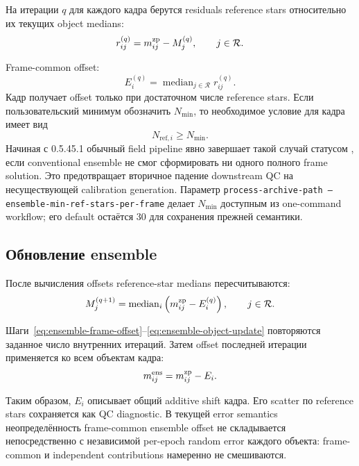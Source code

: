 На итерации $q$ для каждого кадра берутся residuals reference stars относительно их текущих object medians:
\begin{equation}
  r_{ij}^{(q)}=m^{\rm zp}_{ij}-M_j^{(q)},
  \qquad j\in\mathcal R.
\end{equation}

Frame-common offset:
\begin{equation}
  E_i^{(q)}=
  \operatorname{median}_{j\in\mathcal R}r_{ij}^{(q)}.
  \label{eq:ensemble-frame-offset}
\end{equation}
Кадр получает offset только при достаточном числе reference stars. Если пользовательский минимум
обозначить $N_{\min}$, то необходимое условие для кадра имеет вид
\begin{equation}
  N_{\mathrm{ref},i} \ge N_{\min}.
  \label{eq:ensemble-min-ref}
\end{equation}
Начиная с 0.5.45.1 обычный field pipeline явно завершает такой случай статусом
, если conventional ensemble не смог сформировать ни одного
полного frame solution. Это предотвращает вторичное падение downstream QC на несуществующей
calibration generation. Параметр \texttt{process-archive-path --ensemble-min-ref-stars-per-frame}
делает $N_{\min}$ доступным из one-command workflow; его default остаётся 30 для сохранения прежней
семантики.

\subsection{Обновление ensemble}

После вычисления offsets reference-star medians пересчитываются:
\begin{equation}
  M_j^{(q+1)}=
  \operatorname{median}_{i}
  \left(m^{\rm zp}_{ij}-E_i^{(q)}\right),
  \qquad j\in\mathcal R.
  \label{eq:ensemble-object-update}
\end{equation}

Шаги~\eqref{eq:ensemble-frame-offset}--\eqref{eq:ensemble-object-update} повторяются заданное число внутренних итераций. Затем offset последней итерации применяется ко всем объектам кадра:
\begin{equation}
  m^{\rm ens}_{ij}=m^{\rm zp}_{ij}-E_i.
  \label{eq:ensemble-apply}
\end{equation}

Таким образом, $E_i$ описывает общий additive shift кадра. Его scatter по reference stars сохраняется как QC diagnostic. В текущей error semantics неопределённость frame-common ensemble offset не складывается непосредственно с независимой per-epoch random error каждого объекта: frame-common и independent contributions намеренно не смешиваются.

